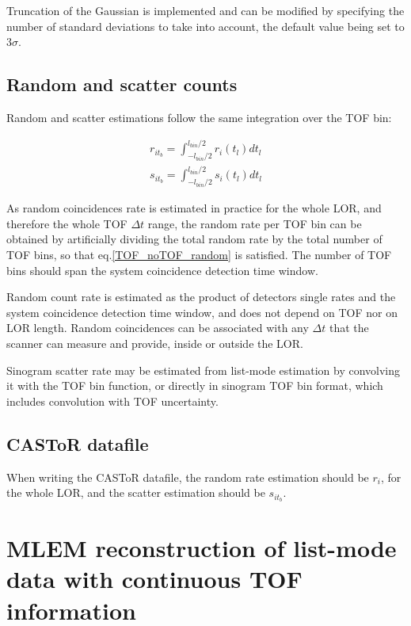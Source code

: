 \documentclass[a4paper, 11pt]{article}
\begin{document}
Truncation of the Gaussian is implemented and can be modified by specifying the number of standard deviations to take into account, the default value being set to $3\sigma$.

\subsection{Random and scatter counts}
Random and scatter estimations follow the same integration over the TOF bin:

\begin{align}
r_{it_b}=\int_{-l_{bin}/2}^{l_{bin}/2}{r_{i}(t_l)dt_l} \\
s_{it_b}=\int_{-l_{bin}/2}^{l_{bin}/2}{s_{i}(t_l)dt_l} 
\end{align}

As random coincidences rate is estimated in practice for the whole LOR, and therefore the whole TOF $\Delta t$ range, the random rate per TOF bin can be obtained by artificially dividing the total random rate by the total number of TOF bins, so that eq.\ref{TOF_noTOF_random} is satisfied. The number of TOF bins should span the system coincidence detection time window.

Random count rate is estimated as the product of detectors single rates and the system coincidence detection time window, and does not depend on TOF nor on LOR length. Random coincidences can be associated with any $\Delta t$ that the scanner can measure and provide, inside or outside the LOR.

Sinogram scatter rate may be estimated from list-mode estimation by convolving it with the TOF bin function, or directly in sinogram TOF bin format, which includes convolution with TOF uncertainty.

\subsection{CASToR datafile}

When writing the CASToR datafile, the random rate estimation should be $r_i$, for the whole LOR, and the scatter estimation should be $s_{it_b}$.

\section{MLEM reconstruction of list-mode data with continuous TOF information}
\end{document}
